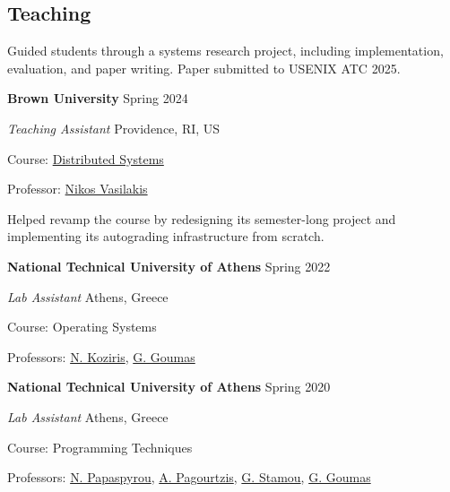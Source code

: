 \documentclass[margin,12pt]{resume}
\newcommand{\descriptionVSpace}{\vspace{0.5ex}\xspace}
\newcommand{\subsectionVSpace}{\vspace{3.5ex}\xspace}
\newcommand{\sectionVSpace}{\vspace{1ex}\xspace} %
\newcommand{\sectionVSpaceCorrection}{\vspace{-3.5ex}} %
\newcommand{\header}[1]{\textbf{#1}\xspace}
\newcommand{\institution}[1]{\header{#1}\xspace}
\newcommand{\place}[1]{#1\xspace}
\newcommand{\role}[1]{\textit{#1}\xspace}
\newcommand{\singleDate}[1]{#1\xspace}
\newcommand{\stitle}[1]{#1:\xspace}
\newenvironment{rSubsection}{}{\par\subsectionVSpace}
\newenvironment{rSection}[1]{\sectionVSpaceCorrection\section{#1}\xspace}{\sectionVSpace\par}
\newenvironment{jobDuties}{\descriptionVSpace}{\par}
\begin{document}
\begin{resume}
\begin{rSection}{Teaching}
\begin{rSubsection}
            \begin{jobDuties}
                Guided students through a systems research project, including implementation, evaluation, and paper writing.
                Paper submitted to USENIX ATC 2025.
            \end{jobDuties}
        \end{rSubsection}

        \begin{rSubsection}
            \institution{Brown University} \hfill \singleDate{Spring 2024}

            \role{Teaching Assistant} \hfill \place{Providence, RI, US}

            \stitle{Course} \href{https://cs.brown.edu/courses/csci1380/s24/}{Distributed Systems}

            \stitle{Professor} \href{https://nikos.vasilak.is}{Nikos Vasilakis}

            \begin{jobDuties}
                Helped revamp the course by redesigning its semester-long project and implementing its autograding infrastructure from scratch.
            \end{jobDuties}
        \end{rSubsection}

        \begin{rSubsection}
            \institution{National Technical University of Athens} \hfill \singleDate{Spring 2022}

            \role{Lab Assistant} \hfill \place{Athens, Greece}

            \stitle{Course} Operating Systems

            \stitle{Professors} \href{http://www.cslab.ntua.gr/~nkoziris/}{N. Koziris}, \href{http://www.cslab.ntua.gr/~goumas/}{G. Goumas}
        \end{rSubsection}

        \begin{rSubsection}
            \institution{National Technical University of Athens} \hfill \singleDate{Spring 2020}

            \role{Lab Assistant} \hfill \place{Athens, Greece}

            \stitle{Course} Programming Techniques

            \stitle{Professors} \href{http://www.softlab.ntua.gr/~nickie/}{N. Papaspyrou}, \href{http://users.softlab.ntua.gr/~pagour/}{A. Pagourtzis}, \href{http://www.image.ntua.gr/~gstam/}{G. Stamou}, \href{http://www.cslab.ntua.gr/~goumas/}{G. Goumas}
        \end{rSubsection}


\end{rSection}
\end{resume}
\end{document}
